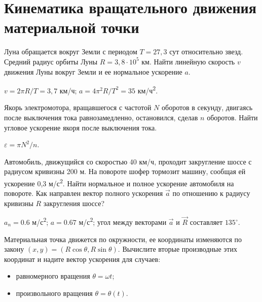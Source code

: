 \section{Кинематика вращательного движения материальной точки}

\introProblems

\begin{ex} %
Луна обращается вокруг Земли с периодом $T = 27,3$ сут относительно звезд. Средний радиус орбиты Луны $R = 3,8 \cdot 10^5$ км. Найти линейную скорость $v$ движения Луны вокруг Земли и ее нормальное ускорение $a$. 
\begin{ans}
$v = 2 \pi R/T = 3,7$ км/ч; $a = 4\pi^2 R/T^2 = 35$ км/ч\textsuperscript{2}.
\end{ans}
\end{ex}

\begin{ex} %
Якорь электромотора, вращавшегося с частотой $N$ оборотов в секунду, двигаясь после выключения тока равнозамедленно, остановился, сделав $n$ оборотов. Найти угловое ускорение якоря после выключения тока.
\begin{ans}
$\varepsilon = \pi N^2/n$.
\end{ans}
\end{ex}

\begin{ex} %
Автомобиль, движущийся со скоростью 40 км/ч, проходит закругление шоссе с радиусом кривизны 200 м. На повороте шофер тормозит машину, сообщая ей ускорение 0,3 м/с\textsuperscript{2}. Найти нормальное и полное ускорение автомобиля на повороте. Как направлен вектор полного ускорения $\vec{a}$ по отношению к радиусу кривизны $R$ закругления шоссе?
\begin{ans}
$a_n = 0.6$ м/с\textsuperscript{2}; $a = 0.67$ м/с\textsuperscript{2}; угол между векторами $\vec{a}$ и $\vec{R}$ составляет $135^{\circ}$.
\end{ans}
\end{ex}

\begin{ex}
Материальная точка движется по окружности, ее координаты изменяются по закону $(x, y) = (R \cos \theta, R \sin \theta)$. Вычислите вторые производные этих координат и надите вектор ускорения для случаев:
\begin{itemize}
\item равномерного вращения $\theta = \omega t$;
\item произвольного вращения $\theta = \theta(t)$.
\end{itemize}
\end{ex}

